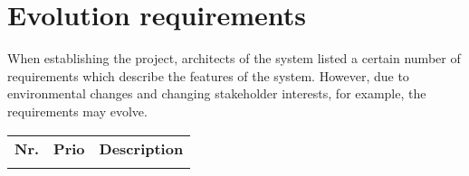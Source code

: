 \section{Evolution requirements}


When establishing the project, architects of the system listed a certain number of requirements which describe the features of the system. However, due to environmental changes and changing stakeholder interests, for example, the requirements may evolve.


\begin{longtable}{L{0.1\textwidth} L{0.12\textwidth} L{0.7\textwidth}}
	\textbf{Nr.} & \textbf{Prio}  & \textbf{Description} \\

	
	 
	\bottomrule
\end{longtable}



 
